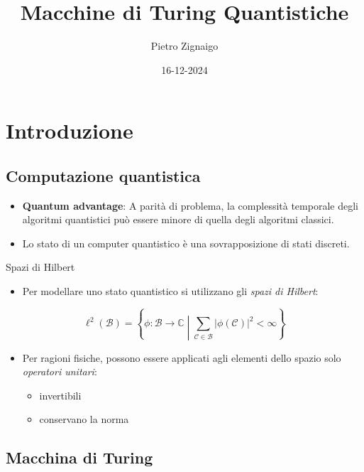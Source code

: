 \documentclass{beamer}
\title
{Macchine di Turing Quantistiche}
\author
{Pietro Zignaigo}
\institute
{Università di Genova}
\date
{16-12-2024}
\def\spacedmiddle#1{\mathrel{}\middle#1\mathrel{}}
\begin{document}
\begin{frame}
	\titlepage
\end{frame}

\begin{frame}
	\tableofcontents
\end{frame}

\section{Introduzione}

\subsection{Computazione quantistica}

\begin{frame}{\subsecname}{}
	\begin{itemize}
		\item \textbf{Quantum advantage}: A parità di problema, la complessità temporale degli algoritmi quantistici può essere minore di quella degli algoritmi classici.
		\item Lo stato di un computer quantistico è una sovrapposizione di stati discreti.
	\end{itemize}
\end{frame}

\begin{frame}{\subsecname}{Spazi di Hilbert}
	\begin{itemize}
		\item Per modellare uno stato quantistico si utilizzano gli \textit{spazi di Hilbert}:
	\end{itemize}
	\[ \ell^{2} \left ( \mathcal{B} \right ) = \left \{ \phi : \mathcal{B} \rightarrow \mathbb{C} \spacedmiddle | \sum_{\mathcal{C} \in \mathcal{B}} \left | \phi \left ( \mathcal{C} \right ) \right |^{2} < \infty \right \}\]
	\begin{itemize}
		\item Per ragioni fisiche, possono essere applicati agli elementi dello spazio solo \textit{operatori unitari}:
		\begin{itemize}
			\item invertibili
			\item conservano la norma
		\end{itemize}
	\end{itemize}
\end{frame}

\subsection{Macchina di Turing}
\end{document}
